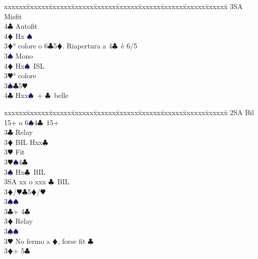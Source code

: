 \documentclass[a4paper,italian]{article}
\newcommand{\BC}{\textcolor{OliveGreen}{$\clubsuit$}}
\newcommand{\BD}{\textcolor{RedOrange}{$\vardiamondsuit$}}
\newcommand{\BH}{\textcolor{Red2}{$\varheartsuit${}}}
\newcommand{\BS}{\textcolor{MidnightBlue}{$\spadesuit${}}}
\newenvironment{bidtable}
{\begin{tabbing}

    xxxxxx\=xxxxxx\=xxxxxx\=xxxxxx\=xxxxxx\=xxxxxx\=xxxxxx\=xxxxxx\=xxxxxx\=xxxxxx\=\kill}
{\end{tabbing} }%
\begin{document}
\begin{multicols}{2}
\begin{bidtable}
                                            3SA \> Misfit\\
                                            4\BC \> Autofit\\
                                            4\BD \> Hx \BS \-\-\\
                                            3\BD {}° colore o 6\BC 5\BD . Riapertura a 4\BC\ è 6/5\+\\
                                            3\BS \> Mono\+\\
                                            4\BD \> Hx\BS\ ISL\-\-\\
                                            3\BH {}° colore \\
                                            3\BS {}\BC 5\BH \\
                                            4\BC \> Hxx\BS\ + \BC\ belle\-\\
                                        \end{bidtable}
                                        \begin{bidtable}
                                            2SA \> Bil 15+ o 6\BS 4\BC\ 15+\+\\
                                            3\BC \> Relay\+\\
                                            3\BD \> BIL Hxx\BC \+\\
                                            3\BH \> Fit\-\\
                                            3\BH {}\BS 4\BC \\
                                            3\BS \> Hx\BC\ BIL\\
                                            3SA \> xx o xxx \BC\ BIL\-\\
                                            3\BD/\BH {}\BC 5\BD /\BH \\
                                            3\BS {}\BS \-\\
                                            3\BC {}+ 4\BC \+\\
                                            3\BD \> Relay\\
                                            3\BS {}\BS \\
                                            3\BH \> No fermo a \BD , forse fit \BC \-\\
                                            3\BD {}+ 5\BC \+\\

\end{bidtable}
\end{multicols}
\end{document}
